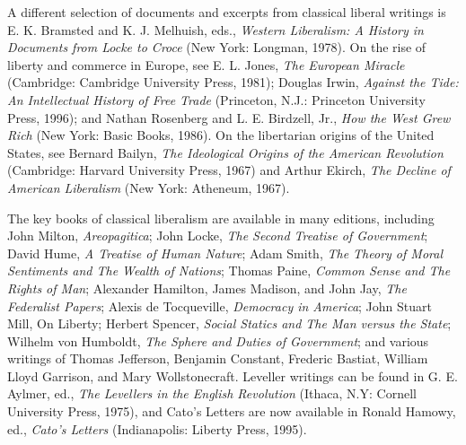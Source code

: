 A different selection of documents and excerpts from classical liberal writings is E. K. Bramsted and K. J. Melhuish, eds., \textit{Western Liberalism: A History
in Documents from Locke to Croce} (New York: Longman, 1978). On the rise of liberty and commerce in Europe, see E. L. Jones, \textit{The European Miracle} (Cambridge: Cambridge University Press, 1981); Douglas Irwin, \textit{Against the Tide:
An Intellectual History of Free Trade} (Princeton, N.J.: Princeton University
Press, 1996); and Nathan Rosenberg and L. E. Birdzell, Jr., \textit{How the West Grew Rich} (New York: Basic Books, 1986). On the libertarian origins of the
United States, see Bernard Bailyn, \textit{The Ideological Origins of the American Revolution} (Cambridge: Harvard University Press, 1967) and Arthur Ekirch, \textit{The Decline of American Liberalism} (New York: Atheneum, 1967).

The key books of classical liberalism are available in many editions, including John Milton, \textit{Areopagitica}; John Locke, \textit{The Second Treatise of Government}; David Hume, \textit{A Treatise of Human Nature}; Adam Smith, \textit{The Theory of
Moral Sentiments and The Wealth of Nations}; Thomas Paine, \textit{Common Sense and
The Rights of Man}; Alexander Hamilton, James Madison, and John Jay, \textit{The Federalist Papers}; Alexis de Tocqueville, \textit{Democracy in America}; John Stuart
Mill, On Liberty; Herbert Spencer, \textit{Social Statics and The Man versus the State};
Wilhelm von Humboldt, \textit{The Sphere and Duties of Government}; and various writings of Thomas Jefferson, Benjamin Constant, Frederic Bastiat, William
Lloyd Garrison, and Mary Wollstonecraft. Leveller writings can be found in
G. E. Aylmer, ed., \textit{The Levellers in the English Revolution} (Ithaca, N.Y: Cornell
University Press, 1975), and Cato's Letters are now available in Ronald
Hamowy, ed., \textit{Cato's Letters} (Indianapolis: Liberty Press, 1995).

